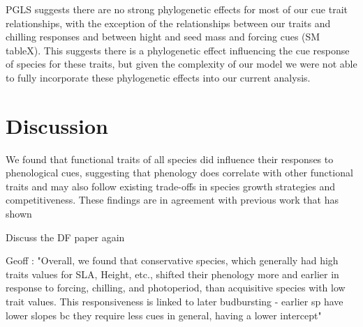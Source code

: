 \documentclass{article}\usepackage[]{graphicx}\usepackage[]{color}
\begin{document}
PGLS suggests there are no strong phylogenetic effects for most of our cue trait relationships, with the exception of the relationships between our traits and chilling responses and between hight and seed mass and forcing cues (SM tableX). This suggests there is a phylogenetic effect influencing the cue response of species for these traits, but given the complexity of our model we were not able to fully incorporate these phylogenetic effects into our current analysis. 

\section{Discussion}

We found that functional traits of all species did influence their responses to phenological cues, suggesting that phenology does correlate with other functional traits and may also follow existing trade-offs in species growth strategies and competitiveness. These findings are in agreement with previous work that has shown

Discuss the DF paper again 

Geoff : "Overall, we found that conservative species, which generally had high traits values for SLA, Height, etc., shifted their phenology more and earlier in response to forcing, chilling, and photoperiod, than acquisitive species with low trait values. This responsiveness is linked to later budbursting - earlier sp have lower slopes bc they require less cues in general, having a lower intercept"
\end{document}
